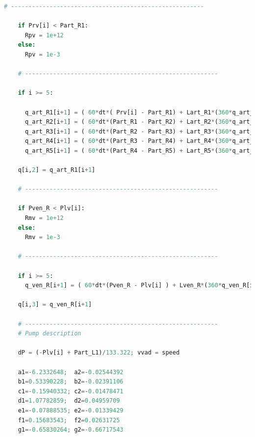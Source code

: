\begin{lstlisting}[language=Python,caption={Математическая модель сердечно-сосудистой системы на языке программирования Python},label={list:cardiovascular_system_model}]
    # -------------------------------------------------------

    if Prv[i] < Part_R1:
      Rpv = 1e+12
    else:
      Rpv = 1e-3

    # -------------------------------------------------------

    if i >= 5:

      q_art_R1[i+1] = ( 60*dt*( Prv[i] - Part_R1) + Lart_R1*(360*q_art_R1[i] - 450*q_art_R1[i-1] + 400*q_art_R1[i-2] - 225*q_art_R1[i-3] + 72*q_art_R1[i-4] - 10*q_art_R1[i-5]) ) / (147*Lart_R1 + 60*dt*(Rart_R1 + Rpv)) 
      q_art_R2[i+1] = ( 60*dt*(Part_R1 - Part_R2) + Lart_R2*(360*q_art_R2[i] - 450*q_art_R2[i-1] + 400*q_art_R2[i-2] - 225*q_art_R2[i-3] + 72*q_art_R2[i-4] - 10*q_art_R2[i-5]) ) / (147*Lart_R2 + 60*dt*Rart_R2)
      q_art_R3[i+1] = ( 60*dt*(Part_R2 - Part_R3) + Lart_R3*(360*q_art_R3[i] - 450*q_art_R3[i-1] + 400*q_art_R3[i-2] - 225*q_art_R3[i-3] + 72*q_art_R3[i-4] - 10*q_art_R3[i-5]) ) / (147*Lart_R3 + 60*dt*Rart_R3)
      q_art_R4[i+1] = ( 60*dt*(Part_R3 - Part_R4) + Lart_R4*(360*q_art_R4[i] - 450*q_art_R4[i-1] + 400*q_art_R4[i-2] - 225*q_art_R4[i-3] + 72*q_art_R4[i-4] - 10*q_art_R4[i-5]) ) / (147*Lart_R4 + 60*dt*Rart_R4)
      q_art_R5[i+1] = ( 60*dt*(Part_R4 - Part_R5) + Lart_R5*(360*q_art_R5[i] - 450*q_art_R5[i-1] + 400*q_art_R5[i-2] - 225*q_art_R5[i-3] + 72*q_art_R5[i-4] - 10*q_art_R5[i-5]) ) / (147*Lart_R5 + 60*dt*Rart_R5)

    q[i,2] = q_art_R1[i+1]

    # -------------------------------------------------------

    if Pven_R < Plv[i]:
      Rmv = 1e+12
    else:
      Rmv = 1e-3

    # -------------------------------------------------------

    if i >= 5:
      q_ven_R[i+1] = ( 60*dt*(Pven_R - Plv[i] ) + Lven_R*(360*q_ven_R[i] - 450*q_ven_R[i-1] + 400*q_ven_R[i-2] - 225*q_ven_R[i-3] + 72*q_ven_R[i-4] - 10*q_ven_R[i-5]) ) / (147*Lven_R + 60*dt*(Rven_R + Rmv)) 

    q[i,3] = q_ven_R[i+1]

    # -------------------------------------------------------
    # Pump description

    dP = (-Plv[i] + Part_L1)/133.322; vvad = speed
    
    a1=-6.2332648;  a2=-0.02544392
    b1=0.53390228;  b2=-0.02391106
    c1=-0.15940332; c2=-0.01478471
    d1=1.07782859;  d2=0.04959709
    e1=-0.07888535; e2=-0.01339429
    f1=0.15683543;  f2=0.02631725
    g1=-0.65830264; g2=-0.66717543


\end{lstlisting}

